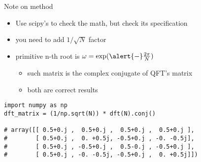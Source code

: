 \begin{frame}[fragile]{Note on  method}
\begin{itemize}
    \item Use scipy's  to check the math, but \alert{check its specification}
    \item you need to add \(1/\sqrt{N}\) factor
    \item primitive n-th root is \(\omega=\exp(\alert{-}\frac{2\pi}{N})\)
    \begin{itemize}
        \item such matrix is the complex conjugate of QFT's matrix
        \item both are correct results
    \end{itemize}
\end{itemize}

\bigskip
\begin{verbatim}
import numpy as np
dft_matrix = (1/np.sqrt(N)) * dft(N).conj()

# array([[ 0.5+0.j ,  0.5+0.j ,  0.5+0.j ,  0.5+0.j ],
#        [ 0.5+0.j ,  0. +0.5j, -0.5+0.j , -0. -0.5j],
#        [ 0.5+0.j , -0.5+0.j ,  0.5-0.j , -0.5+0.j ],
#        [ 0.5+0.j , -0. -0.5j, -0.5+0.j ,  0. +0.5j]])
\end{verbatim}
\end{frame}
